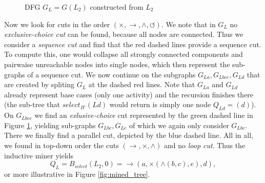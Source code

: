 \documentclass[a4paper]{IEEEtran}
\begin{document}
\begin{figure}[h!]
    \centering

    \caption{DFG $ G_L = G(L_2)$ constructed from $L_2$}
    \label{graph:dfg}
\end{figure}
Now we look for cuts in the order $(\times, \rightarrow, \wedge, \circlearrowleft)$. We note that in $G_L$ no \textit{exclusive-choice cut} can be found, because all nodes are connected. Thus we consider a \textit{sequence cut} and find that the red dashed lines provide a sequence cut. To compute this, one would collapse all strongly connected components and pairwaise unreachable nodes into single nodes, which then represent the sub-graphs of a sequence cut. We now continue on the subgraphs $G_{La}, G_{Lbce}, G_{Ld}$ that are created by spliting $G_L$ at the dashed red lines. Note that $G_{La}$ and $G_{Ld}$ already represent base cases (only one activity) and the recursion finishes there (the sub-tree that $select_{B'}(Ld)$ would return is simply one node $Q_{Ld} = (d)$). On $G_{Lbce}$ we find an \textit{exlusive-choice} cut represented by the green dashed line in Figure \ref{graph:dfg}, yielding sub-graphs $ G_{Lbc}, G_{Le}$ of which we again only consider $G_{Lbc}$. There we finally find a parallel cut, depicted by the blue dashed line. All in all, we found in top-down order the cuts $(\rightarrow, \times, \wedge)$ and no \textit{loop cut}. Thus the inductive miner yields
$$
Q_L = B_{select}(L_2,0) = \rightarrow(a, \times(\wedge(b,c), e),d),
$$
or more illustrative in Figure \ref{fig:mined_tree}.
\end{document}
